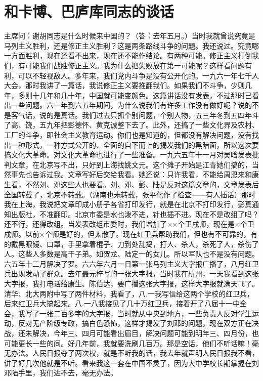 \section[和卡博、巴庐库同志的谈话（一九六七年二月三日）]{和卡博、巴庐库同志的谈话}


主席问：谢胡同志是什么时候来中国的？（答：去年五月。）当时我就曾说究竟是马列主义胜利，还是修正主义胜利？这是两条路线斗争的问题。我还说过。究竟哪一方面胜利，现在还看不出来，现在还不能作结论。有两种可能。修正主义打倒我们，有可能我们战胜修正主义。我为什么把失败放在第一可能呢？这样看问题有利，可以不轻视敌人。多年来，我们党内斗争是没有公开化的。一九六一年七千人大会，那时我讲了一篇话，我说修正主义要推翻我们。如果我们不斗争，少则几年，多则十几年和几十年，中国就可能变颜色。这篇讲话没有发表，不过那时已看出一些问题。六一年到六五年期间，为什么说我们有许多工作没有做好呢？说的不是客气话，说的是真话。我们过去只抓个别问题，个别人物，五三年冬到五四年斗了高、饶，五九年把彭德怀、黄克诚整下去了。此外，还搞了一些文化界及农村、工厂的斗争，即社会主义教育运动。你们也是知道的，但都没有解决问题，没有找出一种形式，一种方式公开的、全面的自下而上的揭发我们的黑暗面，所以这次要搞文化大革命。对文化大革命也进行了一些准备。一九六五年十一月对吴晗发表批判文章，在北京写不出，只好到上海找姚文元。这个摊子开始是江青她们搞的，当然事先也告诉过我。文章写好后交给我看。她还说：只许我看，不能给周恩来和康生看，不然刘、邓这些人也要看。刘、邓、彭、陆是反对这篇文章的，文章发表后全国转载了，北京不转载。（湖南也未转载，张平化作了检查——有人插话）那时我在上海，我说把文章印成小册子各省打印发行，就是在北京不打印发行，彭真通知出版社，不准翻印。北京市委是水也泼不进，针也插不进。现在不是改组了吗？还不行，还得改组。当发表改组市委时，我们增加了××个卫戍师，现在是×个卫戍师。以前×个师是好的，但太散了。现在红卫兵帮助我们，但也有不可靠的，有的戴黑眼镜、口罩，手里拿着棍子、刀到处乱捣，打人、杀人，杀死了人，杀伤了人。这些人多数是高干子弟。如贺龙、陆定一的女儿。所以军队也不是没有问题。六五年十二月解决了罗。六六年六月一日第一张马列主义大字报广播了，八月红卫兵出现发动了群众。去年聂元梓写的一张大字报，当时我在杭州，一天我看到这张大字报，我打电话给康生、陈伯达，要广播这张大字报，这样大字报就满天飞了。清华、北大两附中写了两件材料，我看了，八.一我写信给这两个学校的红卫兵，后来红卫兵大搞起来。八.一八我接见了几十万红卫兵，接着开了八届十一中全会，我写了一张二百多字的大字报，当时就从中央到地方，一些负责人反对学生运动，反对无产阶级专政，搞白色恐怖，这样才揭发了刘邓的问题，现在双方正在决战，还未解决，今年三、四月可能看出眉目，解决问题可能到明年三、四月份，也可能更长一些的间。好几年前，我就要洗刷几百万。那是空话，他们不听话嘛！毫无办法。人民日报夺了两次权，就是不听我的话，我去年就声明人民日报我不看，讲了好几次他就是不听。看来我这一套在中国不灵了，因为大中学校长期掌握在刘邓陆手里，我们进不去，毫无办法。


